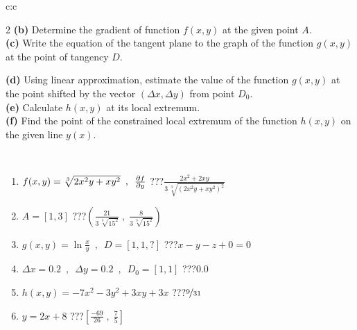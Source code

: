 \documentclass[10pt]{report}
\begin{document}
\begin{tabular}{c:c}
\begin{minipage}[c][104.5mm][t]{0.5\linewidth}
\begin{center}
\begin{minipage}{0.95\linewidth}
\begin{center}
{\begin{multicols}{2}
\textbf{(b)} Determine the gradient of function \(f(x,y)\) at the given point \(A\). \\[1mm]
\textbf{(c)} Write the equation of the tangent plane to the graph of the function \(g(x,y)\) at the point of tangency \(D\). \par \columnbreak
\textbf{(d)} Using linear approximation, estimate the value of the function \(g(x,y)\) at the point shifted by the vector \((\Delta x, \Delta y)\) from point \(D_0\). \\[1mm]
\textbf{(e)} Calculate \(h(x,y)\) at its local extremum. \\[1mm]
\textbf{(f)} Find the point of the constrained local extremum of the function \(h(x,y)\) on the given line \(y(x)\). \\[1mm]
\end{multicols}
}
\end{center}
\end{minipage}
\\[4mm]
\begin{minipage}{0.79\linewidth}
\begin{center}
\begin{varwidth}{\linewidth}
\begin{enumerate}
\normalsizerr
\item $f(x,y) = \sqrt[3]{2x^2y + xy^2}\enspace , \enspace \pdv{f}{y}$\quad \dotfill\; ???\;\dotfill \quad $\frac{2x^2+2xy}{3\,\sqrt[3]{(2x^2y+xy^2)^{2}}}$
\item $A = [1, 3]$\quad \dotfill\; ???\;\dotfill \quad $\left( \frac{21}{3\,\sqrt[3]{15^2}} \;,\; \frac{8}{3\,\sqrt[3]{15^2}} \right)$
\item $g(x,y) = \ln\frac{x}{y} \enspace , \enspace D=[1,1,?]$\quad \dotfill\; ???\;\dotfill \quad $x - y - z + 0 = 0$
\item $\Delta x = {0.2} \enspace,\enspace \Delta y = {0.2} \enspace,\enspace D_0 = [1,1]$\quad \dotfill\; ???\;\dotfill \quad $0.0$
\item $h(x,y) = -7x^2-3y^2+3xy+3x$\quad \dotfill\; ???\;\dotfill \quad $\nicefrac{9}{31}$
\item $y = 2x+8$\quad \dotfill\; ???\;\dotfill \quad $\left[\frac{-69}{26}\;,\;\frac{7}{5}\right]$
\end{enumerate}
\end{varwidth}
\end{center}
\end{minipage}
\begin{minipage}{0.20\linewidth}
\begin{center}

\end{center}
\end{minipage}
\end{center}
\end{minipage}
\end{tabular}
\end{document}
